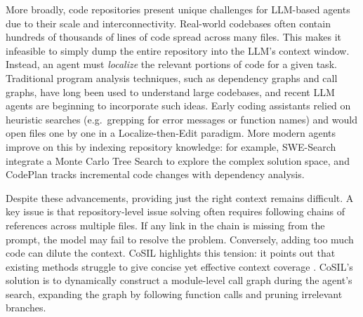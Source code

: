 
More broadly, code repositories present unique challenges for LLM-based agents due to their scale and interconnectivity. Real-world codebases often contain hundreds of thousands of lines of code spread across many files. This makes it infeasible to simply dump the entire repository into the LLM's context window. Instead, an agent must \emph{localize} the relevant portions of code for a given task. Traditional program analysis techniques, such as dependency graphs and call graphs, have long been used to understand large codebases, and recent LLM agents are beginning to incorporate such ideas. Early coding assistants relied on heuristic searches (e.g.\ grepping for error messages or function names) and would open files one by one in a Localize-then-Edit paradigm. More modern agents improve on this by indexing repository knowledge: for example, SWE-Search \cite{antoniades2025swesearchenhancingsoftwareagents} integrate a Monte Carlo Tree Search to explore the complex solution space, and CodePlan \cite{bairi2023codeplanrepositorylevelcodingusing} tracks incremental code changes with dependency analysis.

Despite these advancements, providing just the right context remains difficult. A key issue is that repository-level issue solving often requires following chains of references across multiple files. If any link in the chain is missing from the prompt, the model may fail to resolve the problem. Conversely, adding too much code can dilute the context. CoSIL \cite{jiang2025cosilsoftwareissuelocalization}  highlights this tension: it points out that existing methods struggle to give concise yet effective context coverage . CoSIL's solution is to dynamically construct a module-level call graph during the agent's search, expanding the graph by following function calls and pruning irrelevant branches.

